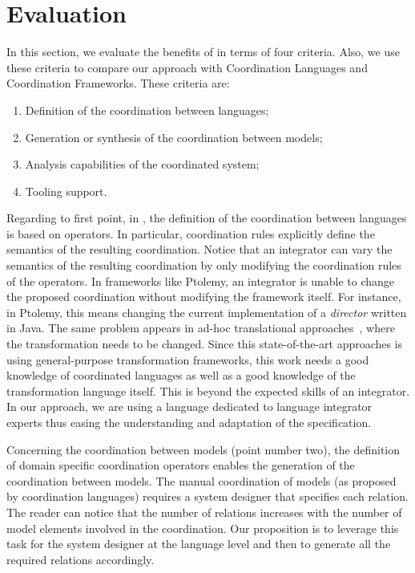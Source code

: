 \section{Evaluation}
\label{sec:evaluation}
In this section, we evaluate the benefits of  \bcool in terms of four criteria. Also, we use these criteria to compare our approach with Coordination Languages and Coordination Frameworks. These criteria are:
	\begin{enumerate}
		\item Definition of the coordination between languages;
		\item Generation or synthesis of the coordination between models; 
		\item Analysis capabilities of the coordinated system;
		\item Tooling support.
	\end{enumerate}  

Regarding to first point, in \bcool, the definition of the coordination between languages is based on operators. In particular, coordination rules explicitly define the semantics of the resulting coordination. Notice that an integrator can vary the semantics of the resulting coordination by only modifying the coordination rules of the operators. In frameworks like Ptolemy, an integrator is unable to change the proposed coordination without modifying the framework itself. For instance, in Ptolemy, this means changing the current implementation of a \emph{director} written in Java. The same problem appears in ad-hoc translational approaches~\cite{dinatale}, where the transformation needs to be changed. Since this state-of-the-art approaches is using general-purpose transformation frameworks, this work needs a good knowledge of coordinated languages as well as a good knowledge of the transformation language itself. This is beyond the expected skills of an integrator. In our approach, we are using a language dedicated to language integrator experts thus easing the understanding and adaptation of the \bcool specification. 

Concerning the coordination between models (point number two), the definition of domain specific coordination operators enables the generation of the coordination between models. The manual coordination of models (as proposed by coordination languages) requires a system designer that specifies each relation. The reader can notice that the number of relations increases with the number of model elements involved in the coordination. Our proposition is to leverage this task for the system designer at the language level and then to generate all the required relations accordingly.

